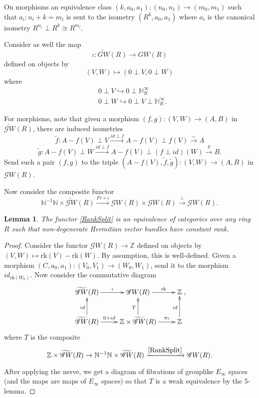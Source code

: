 \documentclass[edeposit,fullpage]{uiucthesis2009}
\newcommand{\Z}{\mathbb Z}
\newcommand{\mbb}{\mathbb}
\theoremstyle{plain}
\newtheorem{lemma}{Lemma}
\numberwithin{lemma}{section}
\theoremstyle{definition}
\begin{document}
On morphisms an equivalence class $(k,a_0,a_1) : (n_0,n_1) \rightarrow
(m_0,m_1)$ such that $a_i : n_i + k = m_i$ is sent to the isometry
$(R^k,a_0,a_1)$ where  $a_i$ is the canonical isometry  $R^{n_i} \perp R^k \cong R^{m_i}$.

Consider as well the map 
\[
\iota: \widetilde{GW}(R) \rightarrow GW(R)
\]
 defined
on objects by
\[
(V,W) \mapsto (0 \perp V,0 \perp W)
\]
where
\begin{align*}
&0 \perp V \hookrightarrow 0 \perp \mbb H^\infty_R \\
&0 \perp W \hookrightarrow 0 \perp
V \perp \mbb H^\infty_R.
\end{align*}

For morphisms, note that given a morphism $(f,g) : (V,W) \rightarrow
(A,B)$ in $\widetilde{\mathscr GW}(R)$, there are induced isometries
\[
\widetilde{f} : A-f(V) \perp V \xrightarrow{id \perp f} A-f(V) \perp
f(V) \xrightarrow{\sim} A
\]
\[
\widetilde{g} : A-f(V) \perp W \xrightarrow{id \perp f} A-f(V) \perp (f \perp id)(W)
\xrightarrow{g} B.
\]  
Send such a pair $(f,g)$ to the triple $(A-f(V),\widetilde f,
\widetilde g) : (V,W) \rightarrow (A,B)$ in $\mathscr GW(R)$.


Now consider the composite functor
\begin{equation}\label{RankSplit}
\mbb N^{-1} \mbb N \times \widetilde{\mathscr GW}(R) \xrightarrow{Fr
  \times \iota}\mathscr GW(R) \times \mathscr GW(R)
\xrightarrow{\perp} \mathscr GW(R).
\end{equation}

\begin{lemma}
The functor \eqref{RankSplit} is an equivalence of categories over any
ring $R$ such that non-degenerate Hermitian vector bundles have
constant rank. 
\end{lemma}

\begin{proof}
Consider the functor $\mathscr GW(R) \rightarrow \Z$
defined on objects by $(V,W) \mapsto
\mathrm{rk}(V)-\mathrm{rk}(W)$. By assumption, this is well-defined. Given a morphism $(C,a_0,a_1) :
(V_0,V_1) \rightarrow (W_0,W_1)$, send it to the morphism
$id_{\mathrm{rk}(W_0)}$. Now consider the commutative diagram
\[
\xymatrix{\widetilde{\mathscr GW}(R) \ar[r]^{\iota} & \mathscr GW(R)
\ar[r]^-{\mathrm{rk}} & \Z \\ \widetilde{\mathscr GW}(R) \ar[u]^{id}
\ar[r]^-{0 \times id} & \Z \times \widetilde{\mathscr GW}(R) \ar[u]^{T} \ar[r]^-{\pi_\Z} & \Z \ar[u]^{id}},
\]
where $T$ is the composite
\[
\Z \times \widetilde{\mathscr GW}(R) \rightarrow 
  \mbb N^{-1}\mbb N \times  \widetilde{\mathscr GW}(R)  \xrightarrow{\eqref{RankSplit}} \mathscr GW(R).
\]

After applying the nerve, we get a diagram of fibrations of grouplike $E_\infty$ spaces (and the
maps are maps of $E_\infty$ spaces) so that $T$ is a weak equivalence
by the 5-lemma. 
\end{proof}
\end{document}
